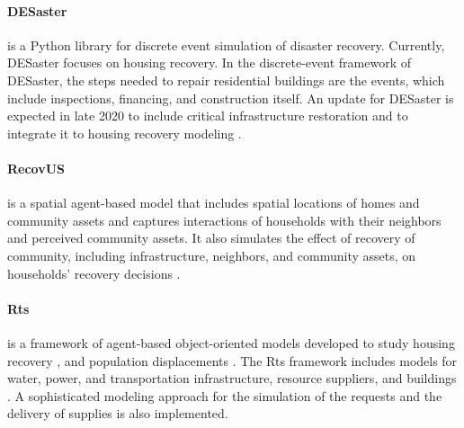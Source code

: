 \paragraph{DESaster} is a Python library for discrete event simulation of disaster recovery. Currently, DESaster focuses on housing recovery. In the discrete-event framework of DESaster, the steps needed to repair residential buildings are the events, which include inspections, financing, and construction itself. An update for DESaster is expected in late 2020 to include critical infrastructure restoration and to integrate it to housing recovery modeling \citep{DESaster}.

\paragraph{RecovUS}  is a spatial agent-based model that includes spatial locations of homes and community assets and captures interactions of households with their neighbors and perceived community assets. It also simulates the effect of recovery of community, including infrastructure, neighbors, and community assets, on households' recovery decisions \citep{moradi2020recovus}. 

\paragraph{Rts}  is a framework of agent-based object-oriented models developed to study housing recovery \citep{costa2020housing}, and population displacements \citep{costa2020predicting}. The Rts framework includes models for water, power, and transportation infrastructure, resource suppliers, and buildings \citep{Costa2019thesis}. A sophisticated modeling approach for the simulation of the requests and the delivery of supplies is also implemented.

